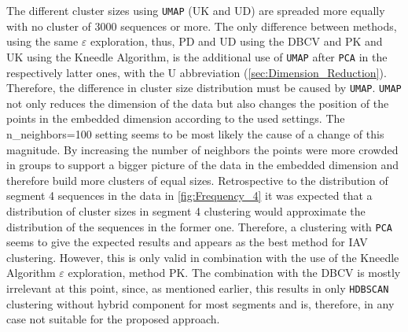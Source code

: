 The different cluster sizes using \texttt{UMAP} (UK and UD) are spreaded more equally with no cluster of 3000 sequences or more. The only difference between methods, using the same $\varepsilon$ exploration, thus, PD and UD using the \gls{DBCV} and PK and UK using the Kneedle Algorithm, is the additional use of \texttt{UMAP} after \texttt{PCA} in the respectively latter ones, with the U abbreviation (\autoref{sec:Dimension_Reduction}). Therefore, the difference in cluster size distribution must be caused by \texttt{UMAP}. \texttt{UMAP} not only reduces the dimension of the data but also changes the position of the points in the embedded dimension according to the used settings. The \colorbox{backcolour}{n\_neighbors=100} setting seems to be most likely the cause of a change of this magnitude. By increasing the number of neighbors the points were more crowded in groups to support a bigger picture of the data in the embedded dimension and therefore build more clusters of equal sizes. Retrospective to the distribution of segment 4 sequences in the data in \autoref{fig:Frequency_4} it was expected that a distribution of cluster sizes in segment 4 clustering would approximate the distribution of the sequences in the former one. Therefore, a clustering with \texttt{PCA} seems to give the expected results and appears as the best method for \gls{IAV} clustering. However, this is only valid in combination with the use of the Kneedle Algorithm $\varepsilon$ exploration, method PK. The combination with the \gls{DBCV} is mostly irrelevant at this point, since, as mentioned earlier, this results in only \texttt{HDBSCAN} clustering without hybrid component for most segments and is, therefore, in any case not suitable for the proposed approach. 


